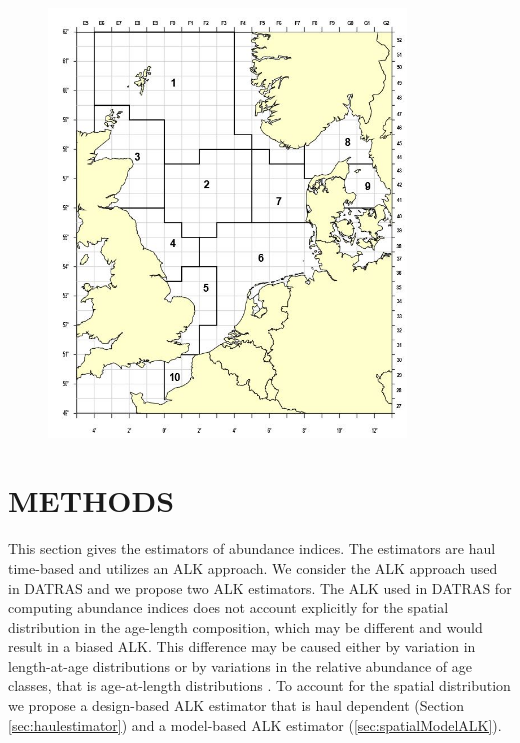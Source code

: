 \documentclass[a4paper 12pt]{article}
\numberwithin{equation}{section}
\begin{document}
\begin{figure}[h!]
  \centering
 {\includegraphics[width=9.5cm]{icesroundfishmap.jpg}}   
\end{figure}

\section{\large METHODS}
\label{sec:methods}
This section gives the estimators of abundance indices. The estimators are haul time-based and utilizes an ALK approach. We consider the ALK approach used in DATRAS and we propose two ALK estimators. The ALK used in DATRAS for computing abundance indices does not account explicitly for the spatial distribution in the age-length composition, which may be different and would result in a biased ALK. This difference may be caused either by variation in length-at-age distributions or by variations in the relative abundance of age classes, that is age-at-length distributions \citep{gerritsen2006simple}.  To account for the spatial distribution we propose a design-based ALK estimator that is haul dependent (Section \ref{sec:haulestimator}) and a model-based ALK estimator (\ref{sec:spatialModelALK}).
\end{document}
